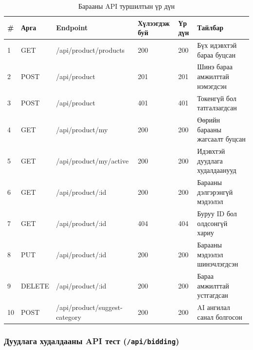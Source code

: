 \begin{table}[htbp]
\centering
\caption{Барааны API туршилтын үр дүн}
\label{tab:product-api}
\begin{tabular}{|p{}|p{}|p{}|p{}|p{}|p{}|}
\hline
\textbf{\#} & \textbf{Арга} & \textbf{Endpoint} & \textbf{Хүлээгдэж буй} & \textbf{Үр дүн} & \textbf{Тайлбар} \\
\hline
1 & GET & /api/product/products & 200 & 200 & Бүх идэвхтэй бараа буцсан \\
\hline
2 & POST & /api/product & 201 & 201 & Шинэ бараа амжилттай нэмэгдсэн \\
\hline
3 & POST & /api/product & 401 & 401 & Токенгүй бол татгалзагдсан \\
\hline
4 & GET & /api/product/my & 200 & 200 & Өөрийн барааны жагсаалт буцсан \\
\hline
5 & GET & /api/product/my/active & 200 & 200 & Идэвхтэй дуудлага худалдаанууд \\
\hline
6 & GET & /api/product/:id & 200 & 200 & Барааны дэлгэрэнгүй мэдээлэл \\
\hline
7 & GET & /api/product/:id & 404 & 404 & Буруу ID бол олдсонгүй хариу \\
\hline
8 & PUT & /api/product/:id & 200 & 200 & Барааны мэдээлэл шинэчлэгдсэн \\
\hline
9 & DELETE & /api/product/:id & 200 & 200 & Бараа амжилттай устгагдсан \\
\hline
10 & POST & /api/product/suggest-category & 200 & 200 & AI ангилал санал болгосон \\
\hline
\end{tabular}
\end{table}

\subsubsection{Дуудлага худалдааны API тест (\texttt{/api/bidding})}

